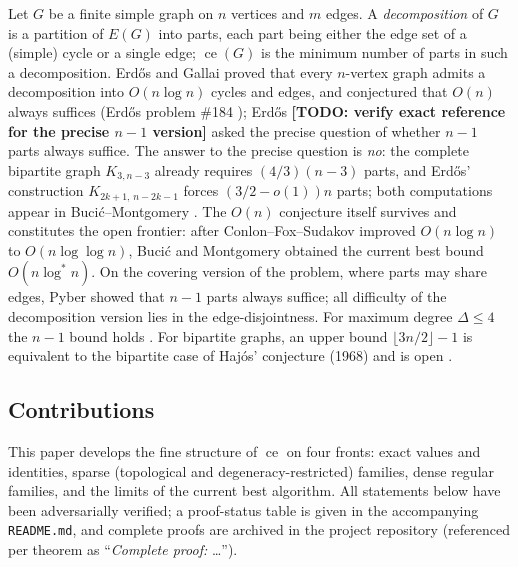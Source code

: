 \documentclass[a4paper,11pt]{amsart}
\theoremstyle{definition}
\theoremstyle{remark}
\newcommand{\ce}{\operatorname{ce}}
\newcommand{\TODO}[1]{\textbf{[TODO: #1]}}
\begin{document}
Let $G$ be a finite simple graph on $n$ vertices and $m$ edges. A \emph{decomposition} of $G$ is a
partition of $E(G)$ into parts, each part being either the edge set of a (simple) cycle or a single edge;
$\ce(G)$ is the minimum number of parts in such a decomposition. Erd\H{o}s and Gallai
\cite{EG} proved that every $n$-vertex graph admits a decomposition into $O(n\log n)$ cycles and edges, and
conjectured that $O(n)$ always suffices (Erd\H{o}s problem \#184 \cite{EP184}); Erd\H{o}s
\cite{E71}\TODO{verify exact reference for the precise $n-1$ version} asked the precise question of whether
$n-1$ parts always suffice. The answer to the precise question is \emph{no}: the complete bipartite graph
$K_{3,n-3}$ already requires $(4/3)(n-3)$ parts, and Erd\H{o}s' construction
$K_{2k+1,\,n-2k-1}$ \cite{E83} forces $(3/2-o(1))n$ parts; both computations appear in
Buci\'c--Montgomery \cite{BM22}. The $O(n)$ conjecture itself survives and constitutes the open frontier:
after Conlon--Fox--Sudakov \cite{CFS14} improved $O(n\log n)$ to $O(n\log\log n)$, Buci\'c and Montgomery
\cite{BM22} obtained the current best bound $O(n\log^* n)$. On the covering version of the problem, where
parts may share edges, Pyber \cite{Py85} showed that $n-1$ parts always suffice; all difficulty of the
decomposition version lies in the edge-disjointness. For maximum degree $\Delta\le 4$ the $n-1$ bound holds
\cite{AABC25}. For bipartite graphs, an upper bound $\lfloor 3n/2\rfloor-1$ is equivalent to the bipartite
case of Haj\'os' conjecture (1968) and is open \cite{HNS17}.

\subsection{Contributions}

This paper develops the fine structure of $\ce$ on four fronts: exact values and identities, sparse
(topological and degeneracy-restricted) families, dense regular families, and the limits of the current
best algorithm. All statements below have been adversarially verified; a proof-status table is given in the
accompanying \texttt{README.md}, and complete proofs are archived in the project repository
(referenced per theorem as ``\emph{Complete proof:} \dots'').
\end{document}
